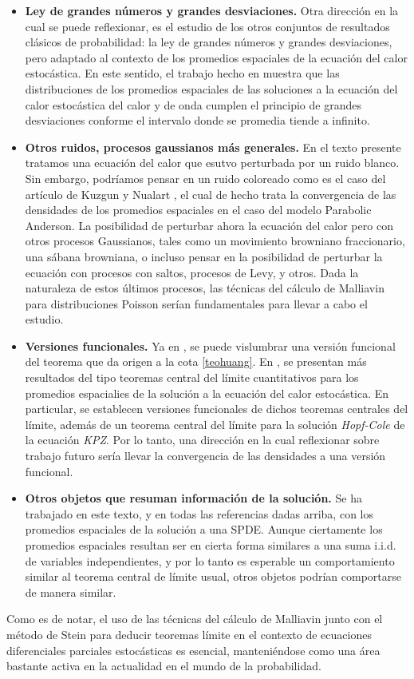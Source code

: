 \documentclass[letterpaper,twoside,12pt]{book}
\newcommand{\1}{\mathds{1}}
\theoremstyle{definition}
\theoremstyle{definition}
\theoremstyle{remark}
\theoremstyle{definition}
\theoremstyle{definition}
\theoremstyle{definition}
\theoremstyle{definition}
\theoremstyle{definition}
\begin{document}
\begin{itemize}
   \item \textbf{Ley de grandes números y grandes desviaciones.} Otra dirección en la cual se puede reflexionar, es el estudio de los otros conjuntos de resultados clásicos de probabilidad: la ley de grandes números y grandes desviaciones, pero adaptado al contexto de los promedios espaciales de la ecuación del calor estocástica. En este sentido, el trabajo hecho en \cite{ebina2024largedeviationsspatialaverage} muestra que las distribuciones de los promedios espaciales de las soluciones a la ecuación del calor estocástica del calor y de onda cumplen el principio de grandes desviaciones conforme el intervalo donde se promedia tiende a infinito.
   \item \textbf{Otros ruidos, procesos gaussianos más generales.} En el texto presente tratamos una ecuación del calor que esutvo perturbada por un ruido blanco. Sin embargo, podríamos pensar en un ruido coloreado como es el caso del artículo de Kuzgun y Nualart \cite{doi:10.1080/17442508.2023.2238954}, el cual de hecho trata la convergencia de las densidades de los promedios espaciales en el caso del modelo Parabolic Anderson. La posibilidad de perturbar ahora la ecuación del calor pero con otros procesos Gaussianos, tales como un movimiento browniano fraccionario, una sábana browniana, o incluso pensar en la posibilidad de perturbar la ecuación con procesos con saltos, procesos de Levy, y otros. Dada la naturaleza de estos últimos procesos, las técnicas del cálculo de Malliavin para distribuciones Poisson serían fundamentales para llevar a cabo el estudio.
   \item \textbf{Versiones funcionales.} Ya en \cite{HUANG20207170}, se puede vislumbrar una versión funcional del teorema que da origen a la cota \eqref{teohuang}. En \cite{Chen2023}, se presentan más resultados del tipo teoremas central del límite cuantitativos para los promedios espacialies de la solución a la ecuación del calor estocástica. En particular, se establecen versiones funcionales de dichos teoremas centrales del límite, además de un teorema central del límite para la solución \textit{Hopf-Cole} de la ecuación \textit{KPZ}. Por lo tanto, una dirección en la cual reflexionar sobre trabajo futuro sería llevar la convergencia de las densidades a una versión funcional.
   \item \textbf{Otros objetos que resuman información de la solución.}
   Se ha trabajado en este texto, y en todas las referencias dadas arriba, con los promedios espaciales de la solución a una SPDE. Aunque ciertamente los promedios espaciales resultan ser en cierta forma similares a una suma i.i.d. de variables independientes, y por lo tanto es esperable un comportamiento similar al teorema central de límite usual, otros objetos podrían comportarse de manera similar. 
\end{itemize}
Como es de notar, el uso de las técnicas del cálculo de Malliavin junto con el método de Stein para deducir teoremas límite en el contexto de ecuaciones diferenciales parciales estocásticas es esencial, manteniéndose como una área bastante activa en la actualidad en el mundo de la probabilidad.
\appendix
\end{document}
